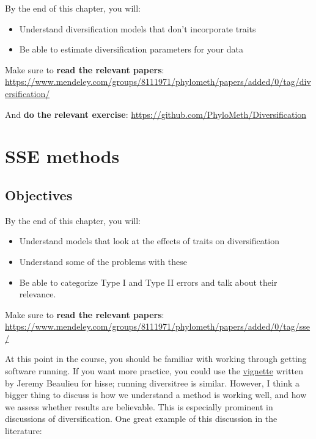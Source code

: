 \documentclass[
]{article}
\providecommand{\tightlist}{%
  \setlength{\itemsep}{0pt}\setlength{\parskip}{0pt}}
\begin{document}
By the end of this chapter, you will:

\begin{itemize}
\tightlist
\item
  Understand diversification models that don't incorporate traits
\item
  Be able to estimate diversification parameters for your data
\end{itemize}

Make sure to \textbf{read the relevant papers}: \url{https://www.mendeley.com/groups/8111971/phylometh/papers/added/0/tag/diversification/}

And \textbf{do the relevant exercise}:
\url{https://github.com/PhyloMeth/Diversification}

\hypertarget{sse-methods}{%
\section{SSE methods}\label{sse-methods}}

\hypertarget{objectives-5}{%
\subsection{Objectives}\label{objectives-5}}

By the end of this chapter, you will:

\begin{itemize}
\tightlist
\item
  Understand models that look at the effects of traits on diversification
\item
  Understand some of the problems with these
\item
  Be able to categorize Type I and Type II errors and talk about their relevance.
\end{itemize}

Make sure to \textbf{read the relevant papers}: \url{https://www.mendeley.com/groups/8111971/phylometh/papers/added/0/tag/sse/}

At this point in the course, you should be familiar with working through getting software running. If you want more practice, you could use the \href{https://cran.r-project.org/web/packages/hisse/vignettes/hisse-vignette.html}{vignette} written by Jeremy Beaulieu for hisse; running diversitree is similar. However, I think a bigger thing to discuss is how we understand a method is working well, and how we assess whether results are believable. This is especially prominent in discussions of diversification. One great example of this discussion in the literature:
\end{document}
